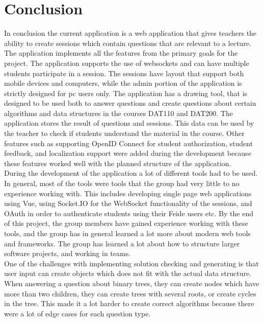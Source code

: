 \section{Conclusion}
In conclusion the current application is a web application that gives teachers the ability to create sessions which contain questions that are relevant to a lecture. The application implements all the features from the primary goals for the project. The application supports the use of websockets and can have multiple students participate in a session. The sessions have layout that support both mobile devices and computers, while the admin portion of the application is strictly designed for pc users only. The application has a drawing tool, that is designed to be used both to answer questions and create questions about certain algorithms and data structures in the courses DAT110 and DAT200. The application stores the result of questions and sessions. This data can be used by the teacher to check if students understand the material in the course. Other features such as supporting OpenID Connect for student authorization, student feedback, and localization support were added during the development because these features worked well with the planned structure of the application. 
\\[11pt]
During the development of the application a lot of different tools had to be used. In general, most of the tools were tools that the group had very little to no experience working with. This includes developing single page web applications using Vue, using Socket.IO for the WebSocket functionality of the sessions, and OAuth in order to authenticate students using their Feide users etc. By the end of this project, the group members have gained experience working with these tools, and the group has in general learned a lot more about modern web tools and frameworks. The group has learned a lot about how to structure larger software projects, and working in teams.
\\[11pt]
One of the challenges with implementing solution checking and generating is that user input can create objects which does not fit with the actual data structure. When answering a question about binary trees, they can create nodes which have more than two children, they can create trees with several roots, or create cycles in the tree. This made it a lot harder to create correct algorithms because there were a lot of edge cases for each question type.

